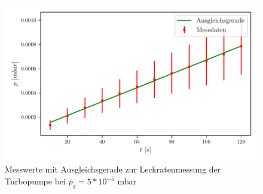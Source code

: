       \begin{figure}[H]
        \centering
        \includegraphics{build/plots/leck_turbo_5e-05.pdf}
        \caption{Messwerte mit Ausgleichsgerade zur Leckratenmessung der Turbopumpe bei $p_g = 5*10^{-5}$ mbar}
        \label{fig:plott3}
      \end{figure}

